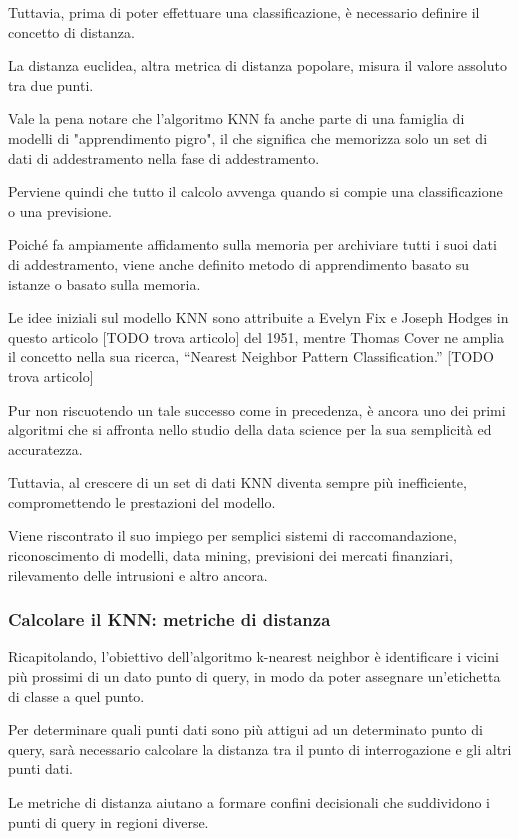 Tuttavia, prima di poter effettuare una classificazione, è necessario definire il concetto di distanza. 

La distanza euclidea, altra metrica di distanza popolare, misura il valore assoluto tra due punti.

Vale la pena notare che l'algoritmo KNN fa anche parte di una famiglia di modelli di "apprendimento pigro", il che significa che memorizza solo un set di dati di addestramento nella fase di addestramento. 

Perviene quindi che tutto il calcolo avvenga quando si compie una classificazione o una previsione. 

Poiché fa ampiamente affidamento sulla memoria per archiviare tutti i suoi dati di addestramento, viene anche definito metodo di apprendimento basato su istanze o basato sulla memoria.

Le idee iniziali sul modello KNN sono attribuite a Evelyn Fix e Joseph Hodges in questo articolo [TODO trova articolo] del 1951, mentre Thomas Cover ne amplia il concetto nella sua ricerca, “Nearest Neighbor Pattern Classification.” [TODO trova articolo] 

Pur non riscuotendo un tale successo come in precedenza, è ancora uno dei primi algoritmi che si affronta nello studio della data science per la sua semplicità ed accuratezza. 

Tuttavia, al crescere di un set di dati KNN diventa sempre più inefficiente, compromettendo le prestazioni del modello. 

Viene riscontrato il suo impiego per semplici sistemi di raccomandazione, riconoscimento di modelli, data mining, previsioni dei mercati finanziari, rilevamento delle intrusioni e altro ancora. 

\subsubsection{Calcolare il KNN: metriche di distanza}
Ricapitolando, l'obiettivo dell'algoritmo k-nearest neighbor è identificare i vicini più prossimi di un dato punto di query, in modo da poter assegnare un'etichetta di classe a quel punto. 

Per determinare quali punti dati sono più attigui ad un determinato punto di query, sarà necessario calcolare la distanza tra il punto di interrogazione e gli altri punti dati. 

Le metriche di distanza aiutano a formare confini decisionali che suddividono i punti di query in regioni diverse. 

